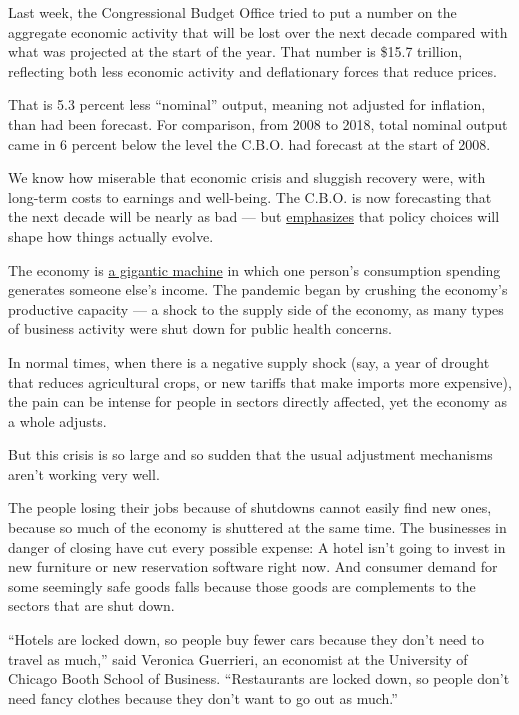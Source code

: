 Last week, the Congressional Budget Office tried to put a number on the
aggregate economic activity that will be lost over the next decade
compared with what was projected at the start of the year. That number
is \$15.7 trillion, reflecting both less economic activity and
deflationary forces that reduce prices.

That is 5.3 percent less ``nominal'' output, meaning not adjusted for
inflation, than had been forecast. For comparison, from 2008 to 2018,
total nominal output came in 6 percent below the level the C.B.O. had
forecast at the start of 2008.

We know how miserable that economic crisis and sluggish recovery were,
with long-term costs to earnings and well-being. The C.B.O. is now
forecasting that the next decade will be nearly as bad --- but
\href{https://www.cbo.gov/publication/56376}{emphasizes} that policy
choices will shape how things actually evolve.

The economy is
\href{https://www.nytimes3xbfgragh.onion/2020/03/17/upshot/coronavirus-economy-crisis-demand-shock.html}{a
gigantic machine} in which one person's consumption spending generates
someone else's income. The pandemic began by crushing the economy's
productive capacity --- a shock to the supply side of the economy, as
many types of business activity were shut down for public health
concerns.

In normal times, when there is a negative supply shock (say, a year of
drought that reduces agricultural crops, or new tariffs that make
imports more expensive), the pain can be intense for people in sectors
directly affected, yet the economy as a whole adjusts.

But this crisis is so large and so sudden that the usual adjustment
mechanisms aren't working very well.

The people losing their jobs because of shutdowns cannot easily find new
ones, because so much of the economy is shuttered at the same time. The
businesses in danger of closing have cut every possible expense: A hotel
isn't going to invest in new furniture or new reservation software right
now. And consumer demand for some seemingly safe goods falls because
those goods are complements to the sectors that are shut down.

``Hotels are locked down, so people buy fewer cars because they don't
need to travel as much,'' said Veronica Guerrieri, an economist at the
University of Chicago Booth School of Business. ``Restaurants are locked
down, so people don't need fancy clothes because they don't want to go
out as much.''

